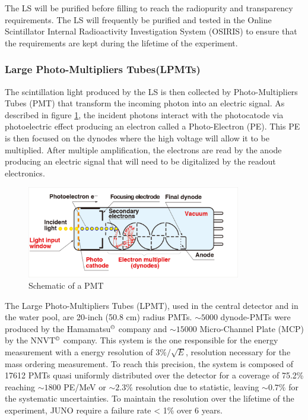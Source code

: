 The LS will be purified before filling to reach the radiopurity and transparency requirements. The LS will frequently be purified and tested in the Online Scintillator Internal Radioactivity Investigation System (OSIRIS) \cite{juno_collaboration_design_2021} to ensure that the requirements are kept during the lifetime of the experiment.

\subsubsection{Large Photo-Multipliers Tubes(LPMTs)}
\label{sec:LPMT}

The scintillation light produced by the LS is then collected by Photo-Multipliers Tubes (PMT) that transform the incoming photon into an electric signal. As described in figure \ref{fig:pmt-schem}, the incident photons interact with the photocatode via photoelectric effect producing an electron called a Photo-Electron (PE). This PE is then focused on the dynodes where the high voltage will allow it to be multiplied. After multiple amplification, the electrons are read by the anode producing an electric signal that will need to be digitalized by the readout electronics.

\begin{figure}[ht]
  \centering
  \includegraphics[height=4cm]{images/juno/pmt_schematic.png}
  \caption{Schematic of a PMT}
  \label{fig:pmt-schem}
\end{figure}

The Large Photo-Multipliers Tubes (LPMT), used in the central detector and in the water pool, are 20-inch (50.8 cm) radius PMTs. $\sim 5000$ dynode-PMTs \cite{noauthor_photomultiplier_nodate} were produced by the Hamamatsu$^{\copyright}$ company and $\sim 15000$ Micro-Channel Plate (MCP) \cite{abusleme_mass_2022} by the NNVT$^{\copyright}$ company. This system is the one responsible for the energy measurement with a energy resolution of $3\%/\sqrt{E}$, resolution necessary for the mass ordering measurement. To reach this precision, the system is composed of 17612 PMTs quasi uniformly distributed over the detector for a coverage of 75.2\% reaching $\sim 1800$ PE/MeV or $\sim 2.3 \%$ resolution due to statistic, leaving $\sim 0.7\%$ for the systematic uncertainties.
To maintain the resolution over the lifetime of the experiment, JUNO require a failure rate < 1\% over 6 years.


